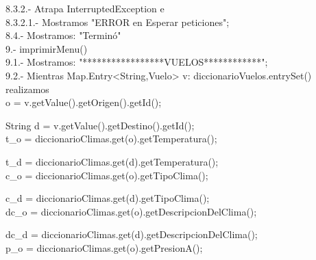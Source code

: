 \documentclass[30pt]{article}
\theoremstyle{definition}
\begin{document}
    \hspace{3cm}8.3.2.- Atrapa InterruptedException e\\
    
    \hspace{4cm}8.3.2.1.- Mostramos "ERROR en Esperar peticiones";\\
    
    \hspace{2cm} 8.4.- Mostramos: "Terminó"\\
    
    \hspace{1cm} 9.- imprimirMenu()\\
    
    \hspace{2cm} 9.1.- Mostramos: "*****************VUELOS************";\\
    
    \hspace{2cm} 9.2.- Mientras Map.Entry<String,Vuelo> v:  diccionarioVuelos.entrySet() realizamos\\
    
    \hspace{3cm} o = v.getValue().getOrigen().getId();
    
  \hspace{3cm} String d = v.getValue().getDestino().getId();\\

  \hspace{3cm} t\_o = diccionarioClimas.get(o).getTemperatura();
  
  \hspace{3cm} t\_d = diccionarioClimas.get(d).getTemperatura();\\

  \hspace{3cm} c\_o = diccionarioClimas.get(o).getTipoClima();
  
  \hspace{3cm} c\_d = diccionarioClimas.get(d).getTipoClima();\\

  \hspace{3cm} dc\_o = diccionarioClimas.get(o).getDescripcionDelClima();
  
  \hspace{3cm} dc\_d = diccionarioClimas.get(d).getDescripcionDelClima();\\

  \hspace{3cm} p\_o = diccionarioClimas.get(o).getPresionA();
  
\end{document}

